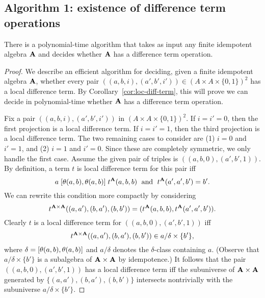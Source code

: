 \draftsecskip

\subsection*{Algorithm 1: existence of difference term operations}
\begin{cor}
  There is a polynomial-time algorithm that takes as input
  any finite idempotent algebra $\mathbf{A}$ and decides whether
  $\mathbf{A}$ has a difference term operation.
\end{cor}
\begin{proof}
  We describe an efficient algorithm for deciding,
  given a finite idempotent algebra $\mathbf{A}$,
  whether every pair $((a,b,i), (a',b',i')) \in (A\times A \times \{0,1\})^2$ has a local
  difference term.  By Corollary~\ref{cor:loc-diff-term}, this will prove we
  can decide in polynomial-time whether $\mathbf{A}$ has a difference term operation.

  Fix a pair
  $((a,b,i), (a',b',i'))$ in $(A\times A \times \{0,1\})^2$. If $i = i' = 0$,
  then the first projection is a local difference term. If $i = i' = 1$,  
    then the third projection is a local difference term. The two remaining cases to
    consider are (1) $i = 0$ and $i'=1$, and (2)
    $i = 1$ and $i'=0$. Since these are completely symmetric, we only handle the
    first case. Assume  the given pair of triples is
    $((a,b,0), (a',b',1))$.  By definition, a term $t$ is local difference term
    for this pair iff
    \[
    a\mathrel{[\theta(a,b), \theta(a,b)]} t^{\mathbf{A}}(a,b,b) \; \text{ and } \;
    t^{\mathbf{A}}(a',a',b') = b'.
    \]
    We can rewrite this condition more compactly by
    considering 
    \[t^{\mathbf{A}\times \mathbf{A}}((a,a'), (b,a'), (b,b')) =
    (t^{\mathbf{A}}(a,b,b),t^{\mathbf{A}}(a',a',b')).\]
    Clearly $t$ is a local difference term for
    $((a,b,0), (a',b',1))$ iff
    \[
    t^{\mathbf{A}\times \mathbf{A}}((a,a'), (b,a'), (b,b'))\in a/\delta \times \{b'\},
    \]
    where $\delta = [\theta(a,b), \theta(a,b)]$ and $a/\delta$ denotes the
    $\delta$-class containing $a$.
    (Observe that $a/\delta \times \{b'\}$ is a subalgebra of $\mathbf{A} \times \mathbf{A}$
    by idempotence.)
    It follows that the pair
    $((a,b,0), (a',b',1))$ has a local difference term iff
    the subuniverse of $\mathbf{A}\times \mathbf{A}$ generated by
    $\{(a,a'), (b,a'), (b,b')\}$ intersects nontrivially with the subuniverse
    $a/\delta \times \{b'\}$.


\end{proof}
